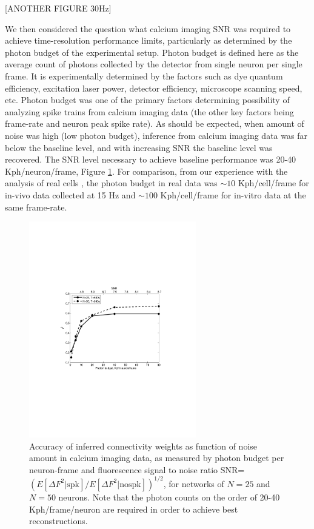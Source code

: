 \documentclass[amsmath,amssymb]{revtex4}
\begin{document}
[ANOTHER FIGURE 30Hz]

We then considered the question what calcium imaging SNR was required to achieve time-resolution performance limits, particularly as determined by the photon budget of the experimental setup. Photon budget is defined here as the average count of photons collected by the detector from single neuron per single frame. It is experimentally determined by the factors such as dye quantum efficiency, excitation laser power, detector efficiency, microscope scanning speed, etc. Photon budget was one of the primary factors determining possibility of analyzing spike trains from calcium imaging data (the other key factors being frame-rate and neuron peak spike rate).
As should be expected, when amount of noise was high (low photon budget), inference from calcium imaging data was far below the baseline level, and with increasing SNR the baseline level was recovered. The SNR level necessary to achieve baseline performance was 20-40 Kph/neuron/frame, Figure \ref{fig:ca-noise}.
For comparison, from our experience with the analysis of real cells \cite{Vogelstein2009}, the photon budget in real data was $\sim 10$ Kph/cell/frame for in-vivo data collected at 15 Hz and $\sim 100$ Kph/cell/frame for in-vitro data at the same frame-rate.
\begin{figure}
\includegraphics[width=275px]{Figure3_perf_vs_gamma}
\caption{Accuracy of inferred connectivity weights as function of noise amount in
calcium imaging data, as measured by photon budget per neuron-frame and fluorescence
signal to noise ratio
SNR=$\left({E[\Delta F^2 | \text{spk}]}/{E[\Delta F^2|\text{nospk}]}\right)^{1/2}$,
for networks of $N=25$ and $N=50$ neurons. Note that the photon counts on the order of 20-40 Kph/frame/neuron are required in order to achieve best reconstructions.}
\label{fig:ca-noise}
\end{figure}
\end{document}
